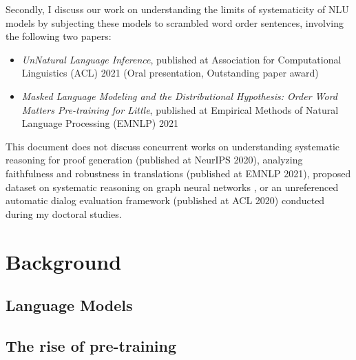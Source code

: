 \documentclass[12pt]{article}
\begin{document}
Secondly, I discuss our work on understanding the limits of systematicity of NLU models by subjecting these models to scrambled word order sentences, involving the following two papers:

\begin{itemize}
  \item \textit{UnNatural Language Inference}, published at Association for Computational Linguistics (ACL) 2021 (Oral presentation, Outstanding paper award) \cite{sinha2021}
  \item \textit{Masked Language Modeling and the Distributional Hypothesis: Order Word Matters Pre-training for Little}, published at Empirical Methods of Natural Language Processing (EMNLP) 2021 \cite{sinha2021a}
\end{itemize}

This document does not discuss concurrent works on understanding systematic reasoning for proof generation \cite{gontier2020} (published at NeurIPS 2020), analyzing faithfulness and robustness in translations \cite{parthasarathi2021a} (published at EMNLP 2021), proposed dataset on systematic reasoning on graph neural networks \cite{sinha2020c}, or an unreferenced automatic dialog evaluation framework \cite{sinha2020d} (published at ACL 2020) conducted during my doctoral studies.






\section{Background}


\subsection{Language Models}



\subsection{The rise of pre-training}
\end{document}
